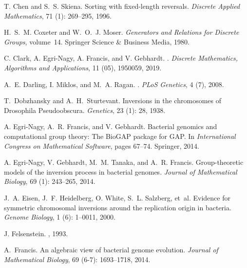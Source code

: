 \documentclass[utf8]{Frontiers_LaTex_Templates/frontiersFPHY} %
\numberwithin{equation}{section}
\begin{document}
\begin{thebibliography}{38}
T. Chen and S.~S. Skiena.
\newblock Sorting with fixed-length reversals.
\newblock \emph{Discrete Applied Mathematics}, 71 (1):
  269--295, 1996.

H.~S.~M. Coxeter and W.~O.~J. Moser.
\newblock \emph{Generators and Relations for Discrete Groups}, volume~14.
\newblock Springer Science \& Business Media, 1980.

C. Clark, A. Egri-Nagy, A. Francis, and V. Gebhardt.
. 
\newblock \emph{Discrete Mathematics, Algorithms and Applications}, 11 (05), 1950059, 2019.

A.~E. Darling, I. Miklos, and M.~A. Ragan.
.
\newblock \emph{PLoS Genetics}, 4 (7), 2008.

T.~Dobzhansky and A.~H.~Sturtevant.
\newblock Inversions in the chromosomes of {D}rosophila {P}seudoobscura.
\newblock \emph{Genetics}, 23 (1): 28, 1938.

A. Egri-Nagy, A.~R. Francis, and V. Gebhardt.
\newblock Bacterial genomics and computational group theory: The {BioGAP}
  package for {GAP}.
\newblock In \emph{International Congress on Mathematical Software}, pages
  67--74. Springer, 2014{}.

A. Egri-Nagy, V. Gebhardt, M.~M. Tanaka, and A.~R. Francis.
\newblock Group-theoretic models of the inversion process in bacterial genomes.
\newblock \emph{Journal of Mathematical Biology}, 69 (1):
  243--265, 2014{}.

J.~A. Eisen, J.~F. Heidelberg, O. White, S.~L. Salzberg, et~al.
\newblock Evidence for symmetric chromosomal inversions around the replication
  origin in bacteria.
\newblock \emph{Genome Biology}, 1 (6): 1--0011, 2000.

J. Felsenstein.
, 1993.

A.~Francis.
\newblock An algebraic view of bacterial genome evolution.
\newblock \emph{Journal of Mathematical Biology}, 69 (6-7):
  1693--1718, 2014.


\end{thebibliography}
\end{document}
